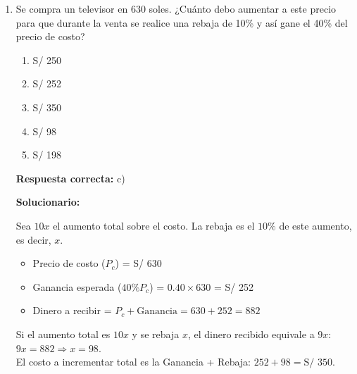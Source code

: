 \begin{enumerate}[resume]
\textbf{Respuesta correcta:} c)

\vspace{2mm}
\textbf{Solucionario:}

Número de monedas por fila ($f$):

Fila 1: $1 \times 1 = 1^2$

Fila 2: $2 \times 2 = 2^2$

Fila 3: $3 \times 3 = 3^2$

Total para 20 filas:

$\sum_{i=1}^{20} i^2 = \dfrac{n(n+1)(2n+1)}{6}$

$S = \dfrac{20(21)(41)}{6} = 10(7)(41) = $

\vspace{6mm}


\item Se compra un televisor en 630 soles. ¿Cuánto debo aumentar a este precio para que durante la venta se realice una rebaja de 10\% y así gane el 40\% del precio de costo?

\begin{enumerate}[label=\alph*)]
	\item S/ 250
	\item S/ 252
	\item S/ 350
	\item S/ 98
	\item S/ 198
\end{enumerate}

\textbf{Respuesta correcta:} c)

\vspace{2mm}
\textbf{Solucionario:}

Sea $10x$ el aumento total sobre el costo. La rebaja es el $10\%$ de este aumento, es decir, $x$.
\begin{itemize}
	\item Precio de costo ($P_c$) = S/ 630
	\item Ganancia esperada ($40\% P_c$) = $0.40 \times 630$ = S/ 252
	\item Dinero a recibir = $P_c + \text{Ganancia} = 630 + 252 = 882$
\end{itemize}
Si el aumento total es $10x$ y se rebaja $x$, el dinero recibido equivale a $9x$:\\
$9x = 882 \Rightarrow x = 98$.\\
El costo a incrementar total es la Ganancia + Rebaja: $252 + 98 = \text{S/ 350}$.\\

\vspace{6mm}


\end{enumerate}
